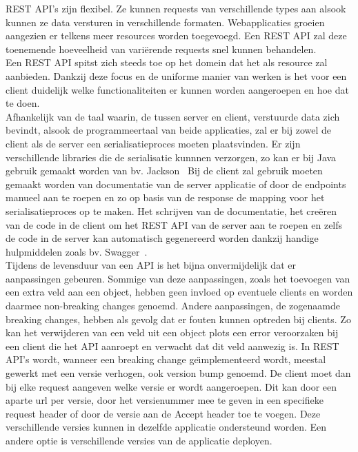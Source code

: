 REST API's zijn flexibel. Ze kunnen requests van verschillende types aan alsook kunnen ze data versturen in verschillende formaten.
Webapplicaties groeien aangezien er telkens meer resources worden toegevoegd. Een REST API zal deze toenemende hoeveelheid van vari\"erende requests snel kunnen behandelen.\\

Een REST API spitst zich steeds toe op het domein dat het als resource zal aanbieden.
Dankzij deze focus en de uniforme manier van werken is het voor een client duidelijk welke functionaliteiten er kunnen worden aangeroepen en hoe dat te doen.\newline
~\autocite{jscrambler,hubspot,HTTP1.1vsHTTP2}\\

Afhankelijk van de taal waarin, de tussen server en client, verstuurde data zich bevindt, alsook de programmeertaal van beide applicaties,
zal er bij zowel de client als de server een serialisatieproces moeten plaatsvinden. Er zijn verschillende libraries die de serialisatie kunnnen verzorgen,
zo kan er bij Java gebruik gemaakt worden van bv. Jackson~\parencite{jackson} \newline
Bij de client zal gebruik moeten gemaakt worden van documentatie van de server applicatie of door de endpoints manueel aan te roepen
en zo op basis van de response de mapping voor het serialisatieproces op te maken. Het schrijven van de documentatie,
het cre\"eren van de code in de client om het REST API van de server aan te roepen en zelfs de code in de server kan automatisch gegenereerd worden dankzij
handige hulpmiddelen zoals bv. Swagger~\parencite{swagger}.\\

Tijdens de levensduur van een API is het bijna onvermijdelijk dat er aanpassingen gebeuren. Sommige van deze aanpassingen, zoals het toevoegen van een extra veld aan een object,
hebben geen invloed op eventuele clients en worden daarmee non-breaking changes genoemd. Andere aanpassingen, de zogenaamde breaking changes, hebben als gevolg dat er
fouten kunnen optreden bij clients. Zo kan het verwijderen van een veld uit een object plots een error veroorzaken bij
een client die het API aanroept en verwacht dat dit veld aanwezig is. In REST API's wordt, wanneer een breaking change ge\"{\i}mplementeerd wordt,
meestal gewerkt met een versie verhogen, ook version bump genoemd. De client moet dan bij elke request aangeven welke versie er wordt aangeroepen.
Dit kan door een aparte url per versie, door het versienummer mee te geven in een specifieke request header of door de versie aan de Accept header toe te voegen.
Deze verschillende versies kunnen in dezelfde applicatie ondersteund worden. Een andere optie is verschillende versies van de applicatie deployen.\newline
~\autocite{restversion}\\

